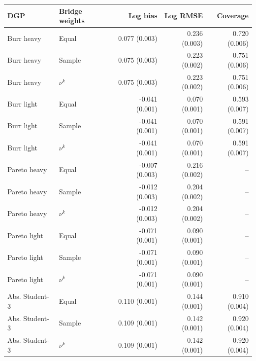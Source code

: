 \begin{tabular}{llrrr}
\toprule
DGP & Bridge weights & Log bias & Log RMSE & Coverage \\
\midrule
Burr heavy & Equal & 0.077 (0.003) & 0.236 (0.003) & 0.720 (0.006) \\
Burr heavy & Sample & 0.075 (0.003) & 0.223 (0.002) & 0.751 (0.006) \\
Burr heavy & $\nu^k$ & 0.075 (0.003) & 0.223 (0.002) & 0.751 (0.006) \\
Burr light & Equal & -0.041 (0.001) & 0.070 (0.001) & 0.593 (0.007) \\
Burr light & Sample & -0.041 (0.001) & 0.070 (0.001) & 0.591 (0.007) \\
Burr light & $\nu^k$ & -0.041 (0.001) & 0.070 (0.001) & 0.591 (0.007) \\
Pareto heavy & Equal & -0.007 (0.003) & 0.216 (0.002) & -- \\
Pareto heavy & Sample & -0.012 (0.003) & 0.204 (0.002) & -- \\
Pareto heavy & $\nu^k$ & -0.012 (0.003) & 0.204 (0.002) & -- \\
Pareto light & Equal & -0.071 (0.001) & 0.090 (0.001) & -- \\
Pareto light & Sample & -0.071 (0.001) & 0.090 (0.001) & -- \\
Pareto light & $\nu^k$ & -0.071 (0.001) & 0.090 (0.001) & -- \\
Abs. Student-3 & Equal & 0.110 (0.001) & 0.144 (0.001) & 0.910 (0.004) \\
Abs. Student-3 & Sample & 0.109 (0.001) & 0.142 (0.001) & 0.920 (0.004) \\
Abs. Student-3 & $\nu^k$ & 0.109 (0.001) & 0.142 (0.001) & 0.920 (0.004) \\
\bottomrule
\end{tabular}
